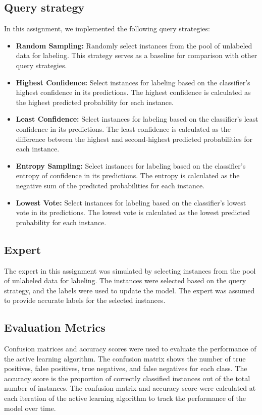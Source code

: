 \subsection{Query strategy}
In this assignment, we implemented the following query strategies:
\begin{itemize}
    \item \textbf{Random Sampling:} Randomly select instances from the pool of unlabeled data for labeling. This strategy serves as a baseline for comparison with other query strategies.
    \item \textbf{Highest Confidence:} Select instances for labeling based on the classifier's highest confidence in its predictions. The highest confidence is calculated as the highest predicted probability for each instance.
    \item \textbf{Least Confidence:} Select instances for labeling based on the classifier's least confidence in its predictions. The least confidence is calculated as the difference between the highest and second-highest predicted probabilities for each instance.    
    \item \textbf{Entropy Sampling:} Select instances for labeling based on the classifier's entropy of confidence in its predictions. The entropy is calculated as the negative sum of the predicted probabilities for each instance.
    \item \textbf{Lowest Vote:} Select instances for labeling based on the classifier's lowest vote in its predictions. The lowest vote is calculated as the lowest predicted probability for each instance.
\end{itemize}

\subsection{Expert}
The expert in this assignment was simulated by selecting instances from the pool of unlabeled data for labeling. The instances were selected based on the query strategy, and the labels were used to update the model. The expert was assumed to provide accurate labels for the selected instances.


\subsection{Evaluation Metrics}
Confusion matrices and accuracy scores were used to evaluate the performance of the active learning algorithm. The confusion matrix shows the number of true positives, false positives, true negatives, and false negatives for each class.
The accuracy score is the proportion of correctly classified instances out of the total number of instances. The confusion matrix and accuracy score were calculated at each iteration of the active learning algorithm to track the performance of the model over time.